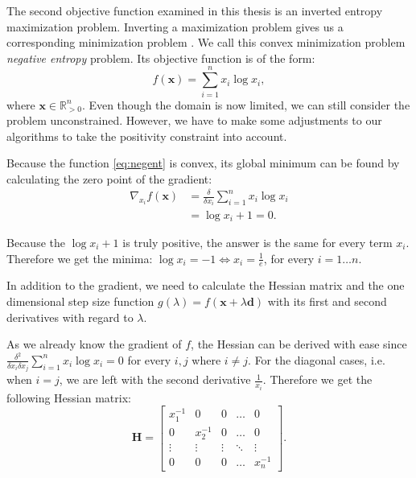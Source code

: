 \documentclass[english, 12pt, a4paper, sci, utf8, a-1b, online, table]{aaltothesis}
\newcommand{\vect}[1]{\ensuremath{\mathbf{#1}}}
\begin{document}
The second objective function examined in this thesis is an inverted entropy maximization problem. Inverting a maximization problem gives us a corresponding minimization problem \cite{book:convex_optimization}. We call this convex minimization problem \emph{negative entropy} problem. Its objective function is of the form:
\begin{equation}\label{eq:negent}
	f(\vect{x}) = \sum_{i=1}^{n} x_i \log x_i,
\end{equation}
where $\vect{x} \in \mathbb{R}_{> 0}^n$. Even though the domain is now limited, we can still consider the problem unconstrained. However, we have to make some adjustments to our algorithms to take the positivity constraint into account.

Because the function \eqref{eq:negent} is convex, its global minimum can be found by calculating the zero point of the gradient:
\begin{align}
    \nabla_{x_i} f(\vect{x}) &= \frac{\delta}{\delta x_i} \sum_{i=1}^{n} x_i \log x_i \\
                      &= \log x_i + 1 = 0.
\end{align}

Because the $\log x_i + 1$ is truly positive, the answer is the same for every term $x_i$. Therefore we get the minima: $\log x_i = -1 \Leftrightarrow x_i = \frac{1}{e}$, for every $i = 1 \dots n$.

In addition to the gradient, we need to calculate the Hessian matrix and the one dimensional step size function $g(\lambda) = f(\vect{x} + \lambda \vect{d})$ with its first and second derivatives with regard to $\lambda$.

As we already know the gradient of $f$, the Hessian can be derived with ease since $\frac{\delta^2}{\delta x_i \delta x_j} \sum_{i=1}^{n} x_i \log x_i = 0$ for every $i, j$ where $i \neq j$. For the diagonal cases, i.e. when $i = j$, we are left with the second derivative $\frac{1}{x_i}$. Therefore we get the following Hessian matrix:
\begin{equation}
    \textbf{H} =
    \begin{bmatrix}
    x_1^{-1} & 0        & 0      & \dots  & 0      \\
    0        & x_2^{-1} & 0      & \dots  & 0      \\
    \vdots   & \vdots   & \vdots & \ddots & \vdots \\
    0        & 0        & 0      & \dots  & x_n^{-1}
\end{bmatrix}.
\end{equation}
\end{document}
